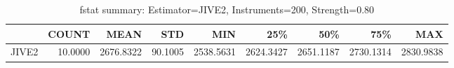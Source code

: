 \begin{table}[ht]
\centering
\caption{fstat summary: Estimator=JIVE2, Instruments=200, Strength=0.80}
\begin{tabular}{lrrrrrrrr}
\toprule
 & COUNT & MEAN & STD & MIN & 25\% & 50\% & 75\% & MAX \\
\midrule
JIVE2 & 10.0000 & 2676.8322 & 90.1005 & 2538.5631 & 2624.3427 & 2651.1187 & 2730.1314 & 2830.9838 \\
\bottomrule
\end{tabular}
\end{table}
